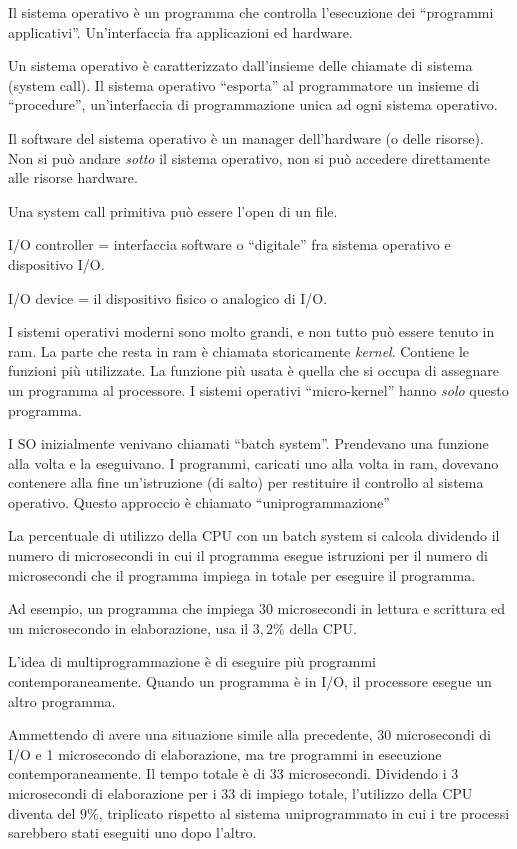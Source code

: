 Il sistema operativo \`e un programma che controlla l'esecuzione dei ``programmi applicativi''. Un'interfaccia fra applicazioni ed hardware.

Un sistema operativo \`e caratterizzato dall'insieme delle chiamate di sistema (system call). Il sistema operativo ``esporta'' al programmatore un insieme di ``procedure'', un'interfaccia di programmazione unica ad ogni sistema operativo.

Il software del sistema operativo \`e un manager dell'hardware (o delle risorse). Non si pu\`o andare \textit{sotto} il sistema operativo, non si pu\`o accedere direttamente alle risorse hardware.

Una system call primitiva pu\`o essere l'open di un file.

I/O controller = interfaccia software o ``digitale'' fra sistema operativo e dispositivo I/O.

I/O device = il dispositivo fisico o analogico di I/O.

I sistemi operativi moderni sono molto grandi, e non tutto pu\`o essere tenuto in ram. La parte che resta in ram \`e chiamata storicamente \textit{kernel}. Contiene le funzioni pi\`u utilizzate. La funzione pi\`u usata \`e quella che si occupa di assegnare un programma al processore. I sistemi operativi ``micro-kernel'' hanno \textit{solo} questo programma.

I SO inizialmente venivano chiamati ``batch system''. Prendevano una funzione alla volta e la eseguivano. I programmi, caricati uno alla volta in ram, dovevano contenere alla fine un'istruzione (di salto) per restituire il controllo al sistema operativo. Questo approccio \`e chiamato ``uniprogrammazione''

La percentuale di utilizzo della CPU con un batch system si calcola dividendo il numero di microsecondi in cui il programma esegue istruzioni per il numero di microsecondi che il programma impiega in totale per eseguire il programma.

Ad esempio, un programma che impiega 30 microsecondi in lettura e scrittura ed un microsecondo in elaborazione, usa il $3,2\%$ della CPU.

L'idea di multiprogrammazione \`e di eseguire pi\`u programmi contemporaneamente. Quando un programma \`e in I/O, il processore esegue un altro programma.

Ammettendo di avere una situazione simile alla precedente, 30 microsecondi di I/O e 1 microsecondo di elaborazione, ma tre programmi in esecuzione contemporaneamente. Il tempo totale \`e di 33 microsecondi. Dividendo i 3 microsecondi di elaborazione per i 33 di impiego totale, l'utilizzo della CPU diventa del $9\%$, triplicato rispetto al sistema uniprogrammato in cui i tre processi sarebbero stati eseguiti uno dopo l'altro.

